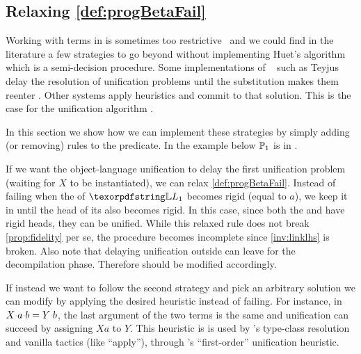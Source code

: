 \subsection{\texorpdfstring{Relaxing \cref{def:progBetaFail}}{Relaxing progress-llam-fail}}
\label{sec:heuristics}
\newcommand{\progBetaNoLLWait}{\emph{progress-beta-\notllambda}}

Working with terms in \llambda is sometimes too restrictive~\cite{pientka2018}
and we could find in the literature a few strategies to go beyond \llambda without 
implementing Huet's algorithm~\cite{huet75} which is a semi-decision procedure.
Some implementations of \lprolog~\cite{miller1988} such as
Teyjus~\cite{teyjus} delay the resolution of \notllambda unification
problems until the substitution makes them reenter \llambda.
Other systems apply heuristics and commit to that solution. This is the case for
the unification algorithm \rocq.

In this section we show how we can implement these strategies
by simply adding (or removing) rules to the
 predicate.
In the example below $\mathbb{P}_1$ is in \notllambda.

% 

%

\noindent
If we want the object-language unification to delay the first unification problem
(waiting for $X$ to be instantiated),
we can relax \cref{def:progBetaFail}. 
Instead of failing when the \lhs of $\linkStore_1$ becomes rigid (equal to $a$),
we keep it in \linkStore until the head of its \rhs also becomes rigid.
In this case, since both the \lhs and \rhs have rigid heads, they can be unified.
While this relaxed rule does not break \cref{prop:fidelity} per se,
the  procedure becomes incomplete since
\cref{inv:linklhs} is broken. Also note that delaying unification outside \llambda can leave \linkbeta for the
decompilation phase. Therefore  should
be modified accordingly.

If instead we want \Uo{} to follow the second strategy and pick an
arbitrary solution we can modify \progress by applying the desired heuristic
instead of failing.
For instance, in $X \appsep a \appsep b = Y \appsep b$, the last
argument of the two terms is the same and unification can succeed by assigning
$X a$ to $Y$.  
This heuristic is is used by \rocq's type-class resolution and vanilla tactics
(like ``apply''), through \rocq's ``first-order'' unification heuristic.

